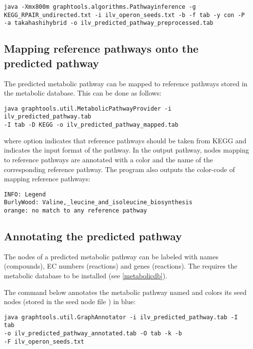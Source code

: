 \begin{lstlisting}
java -Xmx800m graphtools.algorithms.Pathwayinference -g
KEGG_RPAIR_undirected.txt -i ilv_operon_seeds.txt -b -f tab -y con -P 
-a takahashihybrid -o ilv_predicted_pathway_preprocessed.tab
\end{lstlisting}

\subsection{Mapping reference pathways onto the predicted pathway}

The predicted metabolic pathway can be mapped to reference pathways stored in
the metabolic database. This can be done as follows:

\begin{lstlisting}
java graphtools.util.MetabolicPathwayProvider -i ilv_predicted_pathway.tab 
-I tab -D KEGG -o ilv_predicted_pathway_mapped.tab
\end{lstlisting}

where option  indicates that reference pathways should be taken from
KEGG and  indicates the input format of the pathway. In the output
pathway, nodes mapping to reference pathways are annotated with
a color and the name of the corresponding reference pathway. 
The program  also outputs the color-code of mapping reference pathways:

\begin{lstlisting}
INFO: Legend
BurlyWood: Valine,_leucine_and_isoleucine_biosynthesis
orange: no match to any reference pathway
\end{lstlisting}

\subsection{Annotating the predicted pathway}

The nodes of a predicted metabolic pathway can be labeled with names
(compounds), EC numbers (reactions) and genes (reactions). 
The requires the metabolic database to be installed (see
\ref{metabolicdb}).

The command below annotates the metabolic pathway named
 and colors its seed
nodes (stored in the seed node file  ) in blue:

\begin{lstlisting}
java graphtools.util.GraphAnnotator -i ilv_predicted_pathway.tab -I tab 
-o ilv_predicted_pathway_annotated.tab -O tab -k -b 
-F ilv_operon_seeds.txt
\end{lstlisting}

